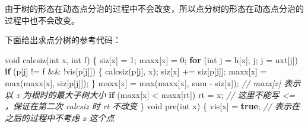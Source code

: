 \documentclass[
]{article}
\newenvironment{Shaded}{}{}
\newcommand{\CommentTok}[1]{\textcolor[rgb]{0.38,0.63,0.69}{\textit{#1}}}
\newcommand{\ControlFlowTok}[1]{\textcolor[rgb]{0.00,0.44,0.13}{\textbf{#1}}}
\newcommand{\DataTypeTok}[1]{\textcolor[rgb]{0.56,0.13,0.00}{#1}}
\newcommand{\DecValTok}[1]{\textcolor[rgb]{0.25,0.63,0.44}{#1}}
\newcommand{\KeywordTok}[1]{\textcolor[rgb]{0.00,0.44,0.13}{\textbf{#1}}}
\newcommand{\NormalTok}[1]{#1}
\newcommand{\OperatorTok}[1]{\textcolor[rgb]{0.40,0.40,0.40}{#1}}
\begin{document}
由于树的形态在动态点分治的过程中不会改变，所以点分树的形态在动态点分治的过程中也不会改变。

下面给出求点分树的参考代码：

\begin{Shaded}
\begin{Highlighting}[]
\DataTypeTok{void}\NormalTok{ calcsiz}\OperatorTok{(}\DataTypeTok{int}\NormalTok{ x}\OperatorTok{,} \DataTypeTok{int}\NormalTok{ f}\OperatorTok{)} \OperatorTok{\{}
\NormalTok{  siz}\OperatorTok{[}\NormalTok{x}\OperatorTok{]} \OperatorTok{=} \DecValTok{1}\OperatorTok{;}
\NormalTok{  maxx}\OperatorTok{[}\NormalTok{x}\OperatorTok{]} \OperatorTok{=} \DecValTok{0}\OperatorTok{;}
  \ControlFlowTok{for} \OperatorTok{(}\DataTypeTok{int}\NormalTok{ j }\OperatorTok{=}\NormalTok{ h}\OperatorTok{[}\NormalTok{x}\OperatorTok{];}\NormalTok{ j}\OperatorTok{;}\NormalTok{ j }\OperatorTok{=}\NormalTok{ nxt}\OperatorTok{[}\NormalTok{j}\OperatorTok{])}
    \ControlFlowTok{if} \OperatorTok{(}\NormalTok{p}\OperatorTok{[}\NormalTok{j}\OperatorTok{]} \OperatorTok{!=}\NormalTok{ f }\OperatorTok{\&\&} \OperatorTok{!}\NormalTok{vis}\OperatorTok{[}\NormalTok{p}\OperatorTok{[}\NormalTok{j}\OperatorTok{]])} \OperatorTok{\{}
\NormalTok{      calcsiz}\OperatorTok{(}\NormalTok{p}\OperatorTok{[}\NormalTok{j}\OperatorTok{],}\NormalTok{ x}\OperatorTok{);}
\NormalTok{      siz}\OperatorTok{[}\NormalTok{x}\OperatorTok{]} \OperatorTok{+=}\NormalTok{ siz}\OperatorTok{[}\NormalTok{p}\OperatorTok{[}\NormalTok{j}\OperatorTok{]];}
\NormalTok{      maxx}\OperatorTok{[}\NormalTok{x}\OperatorTok{]} \OperatorTok{=}\NormalTok{ max}\OperatorTok{(}\NormalTok{maxx}\OperatorTok{[}\NormalTok{x}\OperatorTok{],}\NormalTok{ siz}\OperatorTok{[}\NormalTok{p}\OperatorTok{[}\NormalTok{j}\OperatorTok{]]);}
    \OperatorTok{\}}
\NormalTok{  maxx}\OperatorTok{[}\NormalTok{x}\OperatorTok{]} \OperatorTok{=}
\NormalTok{      max}\OperatorTok{(}\NormalTok{maxx}\OperatorTok{[}\NormalTok{x}\OperatorTok{],}\NormalTok{ sum }\OperatorTok{{-}}\NormalTok{ siz}\OperatorTok{[}\NormalTok{x}\OperatorTok{]);}  \CommentTok{// maxx[x] 表示以 x 为根时的最大子树大小}
  \ControlFlowTok{if} \OperatorTok{(}\NormalTok{maxx}\OperatorTok{[}\NormalTok{x}\OperatorTok{]} \OperatorTok{\textless{}}\NormalTok{ maxx}\OperatorTok{[}\NormalTok{rt}\OperatorTok{])}
\NormalTok{    rt }\OperatorTok{=}\NormalTok{ x}\OperatorTok{;}  \CommentTok{// 这里不能写 \textless{}= ，保证在第二次 calcsiz 时 rt 不改变}
\OperatorTok{\}}
\DataTypeTok{void}\NormalTok{ pre}\OperatorTok{(}\DataTypeTok{int}\NormalTok{ x}\OperatorTok{)} \OperatorTok{\{}
\NormalTok{  vis}\OperatorTok{[}\NormalTok{x}\OperatorTok{]} \OperatorTok{=} \KeywordTok{true}\OperatorTok{;}  \CommentTok{// 表示在之后的过程中不考虑 x 这个点}

\end{Highlighting}
\end{Shaded}
\end{document}
